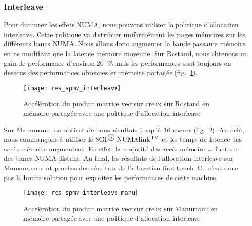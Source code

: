 \subsubsection{Interleave}
Pour diminuer les effets NUMA, nous pouvons utiliser la politique d'allocation interleave.
%
Cette politique va distribuer uniformément les pages mémoires sur les différents bancs NUMA.
%
Nous allons donc augmenter la bande passante mémoire en ne modifiant que la latence mémoire moyenne.
%
Sur Rostand, nous obtenons un gain de performance d'environ 20~\% mais les performances sont toujours en dessous des performances obtenues en mémoire partagée (fig.~\ref{fig:res_spmv_interleave_rostand}).

\begin{figure}[t!]
  \centering
  \texttt{[image: res\_spmv\_interleave]}
  \caption{Accélération du produit matrice vecteur creux sur Rostand en mémoire partagée avec une politique d'allocation interleave}
  \label{fig:res_spmv_interleave_rostand}
\end{figure}

Sur Manumanu, on obtient de bons résultats jusqu'à 16 coeurs (fig.~\ref{fig:res_spmv_interleave_manumanu}).
%
Au delà, nous commençons à utiliser le SGI$^\registered$ NUMAlink$^{\rm TM}$\cite{numalink} et les temps de latence des accès mémoire augmentent.
%
En effet, la majorité des accès mémoire se font sur des bancs NUMA distant.
%
Au final, les résultats de l'allocation interleave sur Manumanu sont proches des résultats de l'allocation first touch.
%
Ce n'est donc pas la bonne solution pour exploiter les performances de cette machine.

\begin{figure}[t!]
  \centering
  \texttt{[image: res\_spmv\_interleave\_manu]}
  \caption{Accélération du produit matrice vecteur creux sur Manumanu en mémoire partagée avec une politique d'allocation interleave}
  \label{fig:res_spmv_interleave_manumanu}
\end{figure}
